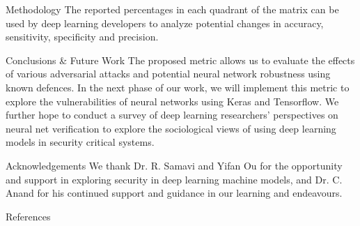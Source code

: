 \documentclass[22pt]{beamer}
\begin{document}
\begin{frame}[fragile]
\begin{textblock}{7.25}
\begin{block}{Methodology}
The reported percentages in each quadrant of the matrix can be used by deep learning developers to analyze potential changes in accuracy, sensitivity, specificity and precision. 
\end{block}


\begin{block}{Conclusions \& Future Work}
The proposed metric allows us to evaluate the effects of various adversarial attacks and potential neural network robustness using known defences. In the next phase of our work, we will implement this metric to explore the vulnerabilities of neural networks using Keras and Tensorflow. We further hope to conduct a survey of deep learning researchers' perspectives on neural net verification to explore the sociological views of using deep learning models in security critical systems.
\end{block}


\begin{block}{Acknowledgements}
We thank Dr. R. Samavi and Yifan Ou for the opportunity and support in exploring security in deep learning machine models, and Dr. C. Anand for his continued support and guidance in our learning and endeavours.
\end{block}

\begin{block}{References}

{\scriptsize
}
\end{block}

\end{textblock}

%
%

\end{frame}
\end{document}
